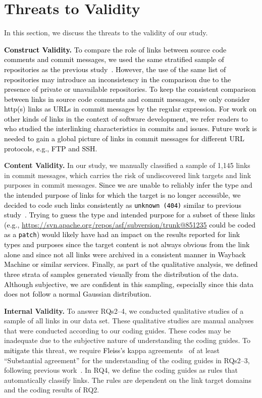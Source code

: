 \documentclass[smallextended]{svjour3}       %
\newcommand{\fix}[1]{\textcolor{black}{#1}}
\newcommand{\minor}[1]{\textcolor{black}{#1}}
\begin{document}
\section{Threats to Validity}
\label{sec:tv}
In this section, we discuss the threats to the validity of our study.

\fix{\textbf{Construct Validity.} To compare the role of links between source code comments and commit messages, we used the same stratified sample of repositories as the previous study~\citep{hata20199}. However, the use of the same list of repositories may introduce an inconsistency in the comparison due to the presence of private or unavailable repositories. To keep the consistent comparison between links in source code comments and commit messages, we only consider http(s) links as URLs in commit messages by the regular expression. For work on other kinds of links in the context of software development, we refer readers to ~\cite{schermann2015discovering} who studied the interlinking characteristics in commits and issues. Future work is needed to gain a global picture of links in commit messages \minor{for different URL protocols, e.g., FTP and SSH}.}

\textbf{Content Validity.} In our study, we manually classified a sample of 1,145 links in commit messages, which carries the risk of undiscovered link targets and link purposes in commit messages. \fix{Since we are unable to reliably infer \minor{the type and} the intended purpose of links for which the target is no longer accessible, we decided to code such links consistently as \minor{\texttt{unknown (404)} similar to previous study~\citep{hata20199}}. Trying to guess the type and intended purpose for a subset of these links \minor{(e.g., \url{https://svn.apache.org/repos/asf/subversion/trunk@851235} could be coded as a \texttt{patch})} would likely have had an impact on the results reported for link types and purposes \minor{since the target content is not always obvious from the link alone and since not all links were archived in a consistent manner in Wayback Machine or similar services.}}
\fix{Finally, as part of the qualitative analysis, we defined three strata of samples generated visually from the distribution of the data. Although subjective, we are confident in this sampling, especially since this data does not follow a normal Gaussian distribution.}

\textbf{Internal Validity.} To answer RQs2--4, we conducted qualitative studies of a sample of all links in our data set. These qualitative studies are manual analyses that were conducted according to our coding guides. These codes may be inadequate due to the subjective nature of understanding the coding guides. To \fix{mitigate} this threat, we require \fix{Fleiss's k}appa agreements~\citep{fleiss1971measuring} of at least ``Substantial agreement'' for the understanding of the coding guides in RQs2--3, following previous work~\citep{wang2021understanding, xiao2021characterizing}.
In RQ4, we define the coding guides as rules that automatically classify links. The rules are dependent on the link target domains and the coding results of RQ2.  
\end{document}
